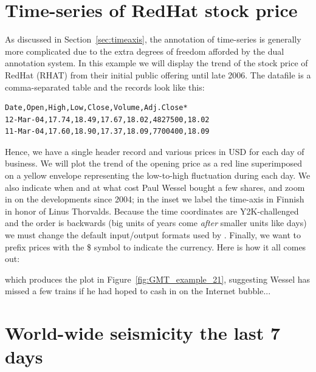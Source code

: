 \section{Time-series of RedHat stock price}

As discussed in Section~\ref{sec:timeaxis}, the annotation of time-series
is generally more complicated due to the extra degrees of freedom afforded
by the dual annotation system.  In this example we will display the trend
of the stock price of RedHat (RHAT) from their initial public offering until
late 2006.  The datafile is a comma-separated table and the records
look like this:
\begin{verbatim}
Date,Open,High,Low,Close,Volume,Adj.Close*
12-Mar-04,17.74,18.49,17.67,18.02,4827500,18.02
11-Mar-04,17.60,18.90,17.37,18.09,7700400,18.09
\end{verbatim}
Hence, we have a single header record and various prices in USD for each
day of business.  We will plot the trend of the opening price as a red line superimposed on
a yellow envelope representing the low-to-high fluctuation during each day.  We
also indicate when and at what cost Paul Wessel bought a few shares, and zoom in
on the developments since 2004; in the inset we label the time-axis in Finnish in honor
of Linus Thorvalds.  Because the time coordinates are Y2K-challenged and the
order is backwards (big units of years come \emph{after} smaller units like
days) we must change the default input/output formats used by \GMT. Finally,
we want to prefix prices with the \$ symbol to indicate the currency.  Here is
how it all comes out:


which produces the plot in Figure~\ref{fig:GMT_example_21}, suggesting Wessel
has missed a few trains if he had hoped to cash in on the Internet bubble...



\section{World-wide seismicity the last 7 days}

